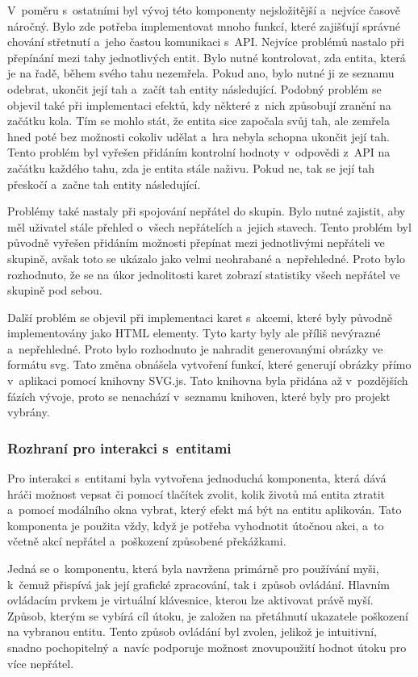 V~poměru s~ostatními byl vývoj této komponenty nejsložitější a~nejvíce časově náročný. Bylo zde potřeba implementovat mnoho funkcí, které zajišťují správné chování střetnutí a~jeho častou komunikaci s~API. Nejvíce problémů nastalo při přepínání mezi tahy jednotlivých entit. Bylo nutné kontrolovat, zda entita, která je na řadě, během svého tahu nezemřela. Pokud ano, bylo nutné ji ze seznamu odebrat, ukončit její tah a~začít tah entity následující. Podobný problém se objevil také při implementaci efektů, kdy některé z~nich způsobují zranění na začátku kola. Tím se mohlo stát, že entita sice započala svůj tah, ale zemřela hned poté bez možnosti cokoliv udělat a~hra nebyla schopna ukončit její tah. Tento problém byl vyřešen přidáním kontrolní hodnoty v~odpovědi z~API na začátku každého tahu, zda je entita stále naživu. Pokud ne, tak se její tah přeskočí a~začne tah entity následující.

Problémy také nastaly při spojování nepřátel do skupin. Bylo nutné zajistit, aby měl uživatel stále přehled o~všech nepřátelích a~jejich stavech. Tento problém byl původně vyřešen přidáním možnosti přepínat mezi jednotlivými nepřáteli ve skupině, avšak toto se ukázalo jako velmi neohrabané a~nepřehledné. Proto bylo rozhodnuto, že se na úkor jednolitosti karet zobrazí statistiky všech nepřátel ve skupině pod sebou.

Další problém se objevil při implementaci karet s~akcemi, které byly původně implementovány jako HTML elementy. Tyto karty byly ale příliš nevýrazné a~nepřehledné. Proto bylo rozhodnuto je nahradit generovanými obrázky ve formátu svg. Tato změna obnášela vytvoření funkcí, které generují obrázky přímo v~aplikaci pomocí knihovny SVG.js. Tato knihovna byla přidána až v~pozdějších fázích vývoje, proto se nenachází v~seznamu knihoven, které byly pro projekt vybrány.

\subsubsection*{Rozhraní pro interakci s~entitami}
Pro interakci s~entitami byla vytvořena jednoduchá komponenta, která dává hráči možnost vepsat či pomocí tlačítek zvolit, kolik životů má entita ztratit a~pomocí modálního okna vybrat, který efekt má být na entitu aplikován. Tato komponenta je použita vždy, když je potřeba vyhodnotit útočnou akci, a~to včetně akcí nepřátel a~poškození způsobené překážkami.

Jedná se o~komponentu, která byla navržena primárně pro používání myši, k~čemuž přispívá jak její grafické zpracování, tak i~způsob ovládání. Hlavním ovládacím prvkem je virtuální klávesnice, kterou lze aktivovat právě myší. Způsob, kterým se vybírá cíl útoku, je založen na přetáhnutí ukazatele poškození na vybranou entitu. Tento způsob ovládání byl zvolen, jelikož je intuitivní, snadno pochopitelný a~navíc podporuje možnost znovupoužití hodnot útoku pro více nepřátel.

